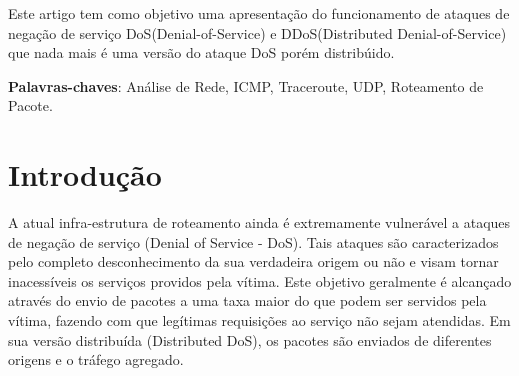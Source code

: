\documentclass[
	article,			%
	11pt,				%
	oneside,			%
	a4paper,			%
	english,			%
	brazil,				%
	sumario=tradicional
	]{abntex2}
\begin{document}
\frenchspacing 


%
%
\maketitle

\begin{resumoumacoluna}
 Este artigo tem como objetivo uma apresentação do funcionamento de ataques de negação de serviço DoS(Denial-of-Service) e DDoS(Distributed Denial-of-Service) que nada mais é uma versão do ataque DoS porém distribúido.
 
 \vspace{\onelineskip}
 
 \noindent
 \textbf{Palavras-chaves}: Análise de Rede, ICMP, Traceroute, UDP, Roteamento de Pacote.
\end{resumoumacoluna}


\textual

\section*{Introdução}
A atual infra-estrutura de roteamento ainda é extremamente vulnerável a ataques de negação de serviço (Denial of Service - DoS). Tais ataques são caracterizados pelo completo desconhecimento da sua verdadeira origem ou não e visam tornar inacessíveis os serviços providos pela vítima. Este objetivo geralmente é alcançado através do envio de pacotes a uma taxa maior do que podem ser servidos pela vítima, fazendo com que legítimas requisições ao serviço não sejam atendidas. Em sua versão distribuída (Distributed DoS), os pacotes são enviados de diferentes origens e o tráfego agregado.
\end{document}
